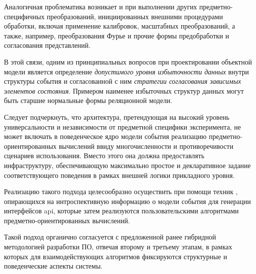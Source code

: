 Аналогичная проблематика возникает и при выполнении других
предметно-специфичных преобразований, инициированных внешними процедурами
обработки, включая применение калибровок, масштабных преобразований,
а также, например, преобразования Фурье и прочие формы предобработки и
согласования представлений.

В этой связи, одним из принципиальных вопросов при проектировании объектной
модели является определение \emph{допустимого уровня избыточности данных}
внутри структуры события и согласованной с ним \emph{стратегии
согласования зависимых элементов состояния}. Примером наименее избыточных
структур данных могут быть старшие нормальные формы реляционной модели.

Следует подчеркнуть, что архитектура, претендующая на высокий уровень
универсальности и независимости от предметной специфики эксперимента, не может
включать в поведенческое ядро модели события реализацию предметно-ориентированных
вычислений ввиду многочисленности и противоречивости сценариев использования.
Вместо этого она должна предоставлять инфраструктуру, обеспечивающую
максимально простое и декларативное задание соответствующего поведения
в рамках внешней логики прикладного уровня.

Реализацию такого подхода целесообразно осуществить при помощи техник
, опирающихся на интроспективную информацию
о модели события для генерации интерфейсов \acrshort{api}, которые затем
реализуются пользовательскими алгоритмами предметно-ориентированных
вычислений.

Такой подход органично согласуется с предложенной ранее гибридной
методологией разработки ПО, отвечая второму и третьему этапам, в рамках
которых для взаимодействующих алгоритмов фиксируются структурные и
поведенческие аспекты системы.

